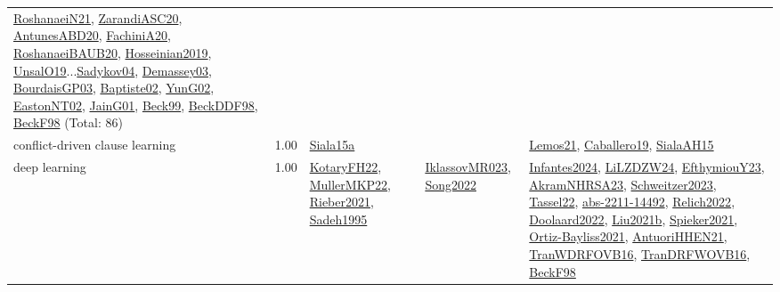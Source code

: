 {\begin{longtable}{p{3cm}r>{\raggedright\arraybackslash}p{6cm}>{\raggedright\arraybackslash}p{6cm}>{\raggedright\arraybackslash}p{8cm}}
\hyperref[detail:RoshanaeiN21]{RoshanaeiN21}, \hyperref[detail:ZarandiASC20]{ZarandiASC20}, \hyperref[detail:AntunesABD20]{AntunesABD20}, \hyperref[detail:FachiniA20]{FachiniA20}, \hyperref[detail:RoshanaeiBAUB20]{RoshanaeiBAUB20}, \hyperref[detail:Hosseinian2019]{Hosseinian2019}, \hyperref[detail:UnsalO19]{UnsalO19}...\hyperref[detail:Sadykov04]{Sadykov04}, \hyperref[detail:Demassey03]{Demassey03}, \hyperref[detail:BourdaisGP03]{BourdaisGP03}, \hyperref[detail:Baptiste02]{Baptiste02}, \hyperref[detail:YunG02]{YunG02}, \hyperref[detail:EastonNT02]{EastonNT02}, \hyperref[detail:JainG01]{JainG01}, \hyperref[detail:Beck99]{Beck99}, \hyperref[detail:BeckDDF98]{BeckDDF98}, \hyperref[detail:BeckF98]{BeckF98} (Total: 86)\\
\index{conflict-driven clause learning}\index{Algorithms!conflict-driven clause learning}conflict-driven clause learning &  1.00 & \hyperref[detail:Siala15a]{Siala15a} &  & \hyperref[detail:Lemos21]{Lemos21}, \hyperref[detail:Caballero19]{Caballero19}, \hyperref[detail:SialaAH15]{SialaAH15}\\
\index{deep learning}\index{Algorithms!deep learning}deep learning &  1.00 & \hyperref[detail:KotaryFH22]{KotaryFH22}, \hyperref[detail:MullerMKP22]{MullerMKP22}, \hyperref[detail:Rieber2021]{Rieber2021}, \hyperref[detail:Sadeh1995]{Sadeh1995} & \hyperref[detail:IklassovMR023]{IklassovMR023}, \hyperref[detail:Song2022]{Song2022} & \hyperref[detail:Infantes2024]{Infantes2024}, \hyperref[detail:LiLZDZW24]{LiLZDZW24}, \hyperref[detail:EfthymiouY23]{EfthymiouY23}, \hyperref[detail:AkramNHRSA23]{AkramNHRSA23}, \hyperref[detail:Schweitzer2023]{Schweitzer2023}, \hyperref[detail:Tassel22]{Tassel22}, \hyperref[detail:abs-2211-14492]{abs-2211-14492}, \hyperref[detail:Relich2022]{Relich2022}, \hyperref[detail:Doolaard2022]{Doolaard2022}, \hyperref[detail:Liu2021b]{Liu2021b}, \hyperref[detail:Spieker2021]{Spieker2021}, \hyperref[detail:Ortiz-Bayliss2021]{Ortiz-Bayliss2021}, \hyperref[detail:AntuoriHHEN21]{AntuoriHHEN21}, \hyperref[detail:TranWDRFOVB16]{TranWDRFOVB16}, \hyperref[detail:TranDRFWOVB16]{TranDRFWOVB16}, \hyperref[detail:BeckF98]{BeckF98}\\

\end{longtable}}
